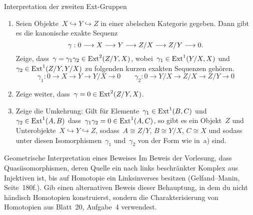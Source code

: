 \documentclass{uebblatt}
\begin{document}
\begin{aufgabe}{Interpretation der zweiten Ext-Gruppen}
\begin{enumerate}
\item Seien Objekte~$X \hookrightarrow Y \hookrightarrow Z$ in einer abelschen
Kategorie gegeben. Dann gibt es die kanonische exakte Sequenz
\[ \gamma : 0 \longrightarrow X \longrightarrow Y \longrightarrow Z/X \longrightarrow Z/Y \longrightarrow 0. \]
Zeige, dass~$\gamma = \gamma_1 \gamma_2 \in \mathrm{Ext}^2(Z/Y,X)$, wobei~$\gamma_1 \in
\mathrm{Ext}^1(Y/X,X)$ und $\gamma_2 \in \mathrm{Ext}^1(Z/Y,Y/X)$ zu folgenden kurzen exakten
Sequenzen gehören.
\[ \gamma_1 : 0 \to X \to Y \to Y/X \to 0 \qquad
  \gamma_2 : 0 \to Y/X \to Z/X \to Z/Y \to 0 \]
\item Zeige weiter, dass~$\gamma = 0 \in \mathrm{Ext}^2(Z/Y,X)$.
\item Zeige die Umkehrung: Gilt für Elemente~$\gamma_1 \in \mathrm{Ext}^1(B,C)$ und
$\gamma_2 \in \mathrm{Ext}^1(A,B)$ dass~$\gamma_1 \gamma_2 = 0 \in \mathrm{Ext}^1(A,C)$, so
gibt es ein Objekt~$Z$ und Unterobjekte~$X \hookrightarrow Y \hookrightarrow
Z$, sodass~$A \cong Z/Y$, $B \cong Y/X$, $C \cong X$ und sodass unter diesen
Isomorphismen~$\gamma_1$ und~$\gamma_2$ von der Form wie in~a) sind.
\end{enumerate}
\end{aufgabe}

\newpage

\begin{aufgabe}{Geometrische Interpretation eines Beweises}
Im Beweis der Vorlesung, dass Quasiisomorphismen, deren Quelle ein nach links
beschränkter Komplex aus Injektiven ist, bis auf Homotopie ein Linksinverses
besitzen (Gelfand--Manin, Seite~180f.). Gib einen alternativen Beweis dieser
Behauptung, in dem du nicht händisch Homotopien konstruierst, sondern die
Charakterisierung von Homotopien aus Blatt~20, Aufgabe~4 verwendest.
\end{aufgabe}
\end{document}
